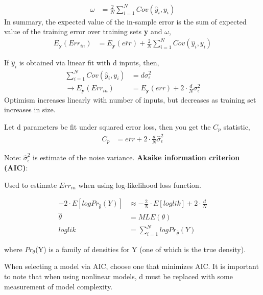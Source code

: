 \documentclass[11pt]{labbook}
\begin{document}
\begin{align*}
\omega &= \frac{2}{N}\sum_{i=1}^{N}Cov\left(\hat{y}_i,y_i\right)
\end{align*}
In summary, the expected value of the in-sample error is the sum of expected value of the training error over training sets \textbf{y} and $\omega$,
\begin{align*}
 E_{\textbf{y}}(Err_{in}) &= E_{\textbf{y}}(\overline{err}) + \frac{2}{N}\sum_{i=1}^{N}Cov\left(\hat{y}_i,y_i\right)
\end{align*}   

If $\hat{y}_i$ is obtained via linear fit with d inputs, then,
\begin{align*}
\sum_{i=1}^{N}Cov\left(\hat{y}_i,y_i\right) &= d\sigma_{\epsilon}^{2} \\
\rightarrow  E_{\textbf{y}}(Err_{in}) &= E_{\textbf{y}}(\overline{err}) + 2 \cdot \frac{d}{N}\sigma_{\epsilon}^{2}
\end{align*}
Optimism increases linearly with number of inputs, but decreases as training set increases in size. 

Let d parameters be fit under squared error loss, then you get the $C_p$ statistic,
\begin{align*}
C_p &= \overline{err} + 2 \cdot \frac{d}{N}\hat{\sigma}_{\epsilon}^{2}
\end{align*}

Note: $\hat{\sigma}_{\epsilon}^{2}$ is estimate of the noise variance.
\newline
\newline
\textbf{Akaike information criterion (AIC)}:\newline

Used to estimate $Err_{in}$ when using log-likelihood loss function. 

\begin{align*}
-2 \cdot E\left[logPr_{\hat{\theta}}(Y)\right] &\approx -\frac{2}{N} \cdot E\left[loglik\right] + 2 \cdot \frac{d}{N} \\
\hat{\theta} &= MLE(\theta) \\
loglik &= \sum_{i=1}^{N}logPr_{\hat{\theta}}(Y)
\end{align*}

where $Pr_{\theta}$(Y) is a family of densities for Y (one of which is the true density).

When selecting a model via AIC, choose one that minimizes AIC. It is important to note that when using nonlinear models, d must be replaced with some measurement of model complexity. 
\end{document}
